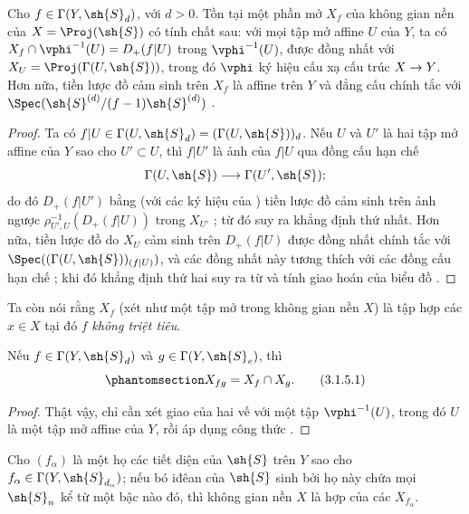 \documentclass[oneside,10pt]{amsart}
\makeatletter
\newcommand{\ega@arrow}[2]{\mathchoice{#1}{#2}{#2}{#2}}
\renewcommand{\to}{\ega@arrow{\longrightarrow}{\rightarrow}}
\newcommand{\oldpage}[2][]{\marginnote{\normalfont\footnotesize\textbf{#1}~|~#2}\ignorespaces}
\let\EGAOriginalLabel\label
\renewcommand{\label}[1]{\phantomsection\EGAOriginalLabel{#1}}
\makeatother
\begin{document}
\begin{proposition}[3.1.4]
\label{II.3.1.4}
Cho $f\in\Gamma(Y,\sh{S}_d)$, với $d>0$.
Tồn tại một phần mở $X_f$ của không gian nền của $X=\Proj(\sh{S})$ có tính chất sau:
với mọi tập mở affine $U$ của $Y$,
\oldpage[II]{51}
ta có $X_f\cap\vphi^{-1}(U)=D_+(f|U)$ trong $\vphi^{-1}(U)$, được đồng nhất với $X_U=\Proj(\Gamma(U,\sh{S}))$, trong đó $\vphi$ ký hiệu cấu xạ cấu trúc $X\to Y$.
Hơn nữa, tiền lược đồ cảm sinh trên $X_f$ là affine trên $Y$ và đẳng cấu chính tắc với $\Spec(\sh{S}^{(d)}/(f-1)\sh{S}^{(d)})$ .
\end{proposition}

\begin{proof}
Ta có $f|U\in\Gamma(U,\sh{S}_d)=(\Gamma(U,\sh{S}))_d$.
Nếu $U$ và $U'$ là hai tập mở affine của $Y$ sao cho $U'\subset U$, thì $f|U'$ là ảnh của $f|U$ qua đồng cấu hạn chế
\[
  \Gamma(U,\sh{S}) \to \Gamma(U',\sh{S});
\]
do đó $D_+(f|U')$ bằng (với các ký hiệu của ) tiền lược đồ cảm sinh trên ảnh ngược $\rho_{U',U}^{-1}(D_+(f|U))$ trong $X_{U'}$ ;
từ đó suy ra khẳng định thứ nhất.
Hơn nữa, tiền lược đồ do $X_U$ cảm sinh trên $D_+(f|U)$ được đồng nhất chính tắc với $\Spec((\Gamma(U,\sh{S}))_{(f|U)})$, và các đồng nhất này tương thích với các đồng cấu hạn chế ;
khi đó khẳng định thứ hai suy ra từ  và tính giao hoán của biểu đồ .
\end{proof}

Ta còn nói rằng $X_f$ (xét như một tập mở trong không gian nền $X$) là tập hợp các $x\in X$ tại đó $f$ \emph{không triệt tiêu}.

\begin{corollary}[3.1.5]
\label{II.3.1.5}
Nếu $f\in\Gamma(Y,\sh{S}_d)$ và $g\in\Gamma(Y,\sh{S}_e)$, thì
\[
\label{II.3.1.5.1}
  X_{fg}=X_f\cap X_g.
\tag{3.1.5.1}
\]
\end{corollary}

\begin{proof}
Thật vậy, chỉ cần xét giao của hai vế với một tập $\vphi^{-1}(U)$, trong đó $U$ là một tập mở affine của $Y$, rồi áp dụng công thức .
\end{proof}

\begin{corollary}[3.1.6]
\label{II.3.1.6}
Cho $(f_\alpha)$ là một họ các tiết diện của $\sh{S}$ trên $Y$ sao cho $f_\alpha\in\Gamma(Y,\sh{S}_{d_\alpha})$;
nếu bó iđêan của $\sh{S}$ sinh bởi họ này  chứa mọi $\sh{S}_n$ kể từ một bậc nào đó, thì không gian nền $X$ là hợp của các $X_{f_\alpha}$.
\end{corollary}
\end{document}
